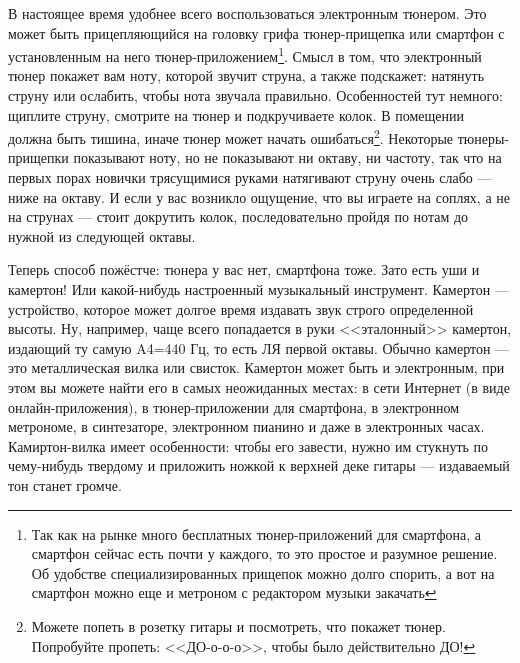 В настоящее время удобнее всего воспользоваться электронным тюнером. Это может быть прицепляющийся на головку грифа тюнер-прищепка или смартфон с установленным на него тюнер-приложением\footnote{Так как на рынке много бесплатных тюнер-приложений для смартфона, а смартфон сейчас есть почти у каждого, то это простое и разумное решение. Об удобстве специализированных прищепок можно долго спорить, а вот на смартфон можно еще и метроном с редактором музыки закачать}. Смысл в том, что электронный тюнер покажет вам ноту, которой звучит струна, а также подскажет: натянуть струну или ослабить, чтобы нота звучала правильно. Особенностей тут немного: щиплите струну, смотрите на тюнер и подкручиваете колок. В помещении должна быть тишина, иначе тюнер может начать ошибаться\footnote{Можете попеть в розетку гитары и посмотреть, что покажет тюнер. Попробуйте пропеть: <<ДО-о-о-о>>, чтобы было действительно ДО!}. Некоторые тюнеры-прищепки показывают ноту, но не показывают ни октаву, ни частоту, так что на первых порах новички трясущимися руками натягивают струну очень слабо --- ниже на октаву. И если у вас возникло ощущение, что вы играете на соплях, а не на струнах --- стоит докрутить колок, последовательно пройдя по нотам до нужной из следующей октавы.

Теперь способ пожёстче: тюнера у вас нет, смартфона тоже. Зато есть уши и камертон! Или какой-нибудь настроенный музыкальный инструмент. Камертон --- устройство, которое может долгое время издавать звук строго определенной высоты. Ну, например, чаще всего попадается в руки <<эталонный>> камертон, издающий ту самую A4=440 Гц, то есть ЛЯ первой октавы. Обычно камертон --- это металлическая вилка или свисток. Камертон может быть и электронным, при этом вы можете найти его в самых неожиданных местах: в сети Интернет (в виде онлайн-приложения), в тюнер-приложении для смартфона, в электронном метрономе, в синтезаторе, электронном пианино и даже в электронных часах. Камиртон-вилка имеет особенности: чтобы его завести, нужно им стукнуть по чему-нибудь твердому и приложить ножкой к верхней деке гитары --- издаваемый тон станет громче.

